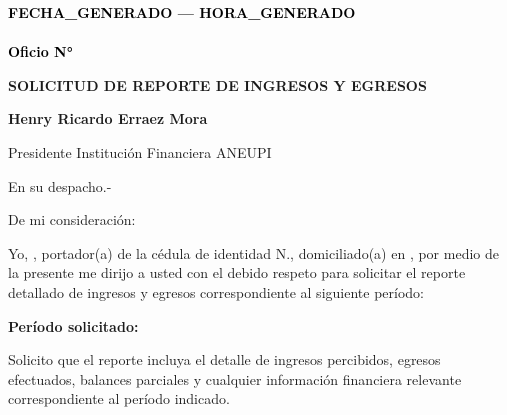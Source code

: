 \documentclass[a4paper,12pt]{article}
\begin{document}
\pagestyle{empty}

\vspace*{-5.5cm}
\begin{flushright}
{\footnotesize \textcolor{black}{\textbf{{{FECHA_GENERADO}} --- {{{HORA_GENERADO}}}}}} \\[-10pt] %
{\footnotesize \textcolor{black}{\underline{\hspace{7.5cm}}}} \\[-2pt] %
{\footnotesize \textcolor{black}{\textbf{Oficio N° }}} 
\end{flushright}


\vspace{2.5cm}
\noindent
\hspace*{\dimexpr\textwidth+1cm\relax}


\begin{center}
    \textbf{\large SOLICITUD DE REPORTE DE INGRESOS Y EGRESOS}
\end{center}

\vspace{0.8cm}

\noindent \textbf{Henry Ricardo Erraez Mora} 

\noindent Presidente Institución Financiera ANEUPI 

\noindent En su despacho.-

\vspace{1cm}

\noindent De mi consideración:

\noindent Yo, \textbf{\underline{\hspace{6cm}}}, portador(a) de la cédula de identidad N.\textbf{\underline{\hspace{4cm}}}, domiciliado(a) en \textbf{\underline{\hspace{8cm}}}, por medio de la presente me dirijo a usted con el debido respeto para solicitar el reporte detallado de ingresos y egresos correspondiente al siguiente período:

\vspace{0.8cm}

\noindent
\begin{center}
\textbf{Período solicitado: }
\vspace{0.5cm}
\textbf{\underline{\hspace{6cm}}}
\end{center}

\noindent Solicito que el reporte incluya el detalle de ingresos percibidos, egresos efectuados, balances parciales y cualquier información financiera relevante correspondiente al período indicado.
\end{document}

